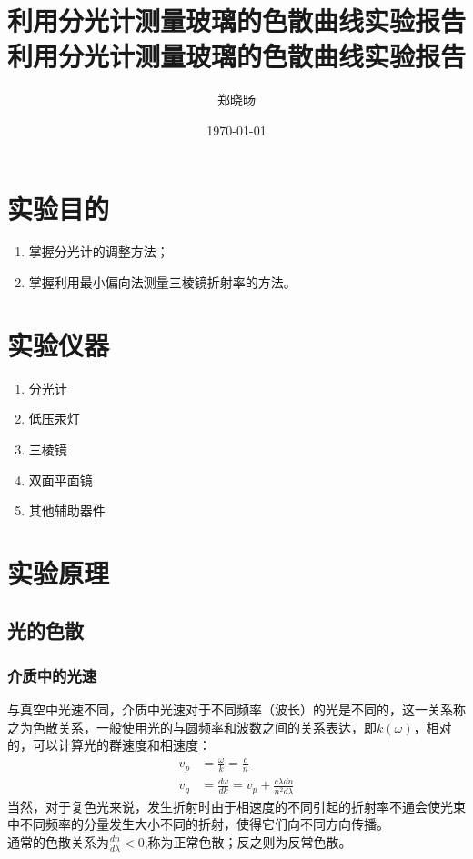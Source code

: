 \documentclass[UTF8]{ctexart}
\title{利用分光计测量玻璃的色散曲线实验报告}
\title{利用分光计测量玻璃的色散曲线实验报告}
\author{郑晓旸}
\date{\today}
\begin{document}
\fancyfoot[C]{\thepage}

\maketitle
\newpage
\tableofcontents
\newpage

\section{实验目的}
    \begin{enumerate}
            \item 掌握分光计的调整方法；
            \item 掌握利用最小偏向法测量三棱镜折射率的方法。
    \end{enumerate} 


\section{实验仪器}
\begin{enumerate}
    \item 分光计
    \item 低压汞灯
    \item 三棱镜
    \item 双面平面镜
    \item 其他辅助器件
\end{enumerate}

\section{实验原理}
\subsection{光的色散}
\subsubsection{介质中的光速}
与真空中光速不同，介质中光速对于不同频率（波长）的光是不同的，这一关系称之为色散关系，一般使用光的与圆频率和波数之间的关系表达，即$k(\omega)$，相对的，可以计算光的群速度和相速度：\\
\begin{align}
    v_p&=\frac{\omega}{k}=\frac{c}{n}\\v_g&=\frac{d\omega}{dk}=v_p+\frac{c\lambda dn}{n^2d\lambda}
\end{align}
当然，对于复色光来说，发生折射时由于相速度的不同引起的折射率不通会使光束中不同频率的分量发生大小不同的折射，使得它们向不同方向传播。
\\
通常的色散关系为$\frac{dn}{d\lambda}<0$,称为正常色散；反之则为反常色散。
\end{document}

